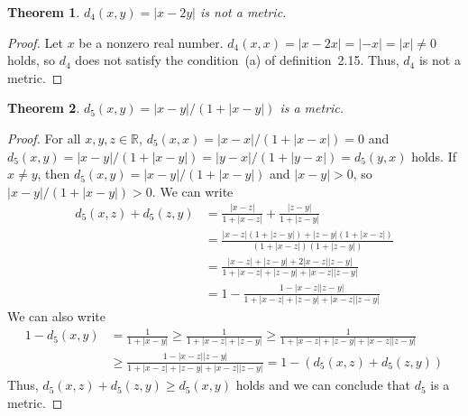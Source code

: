 \documentclass{scrartcl}
\newtheorem{theorem}{Theorem}
\begin{document}
\begin{theorem}
  \(d_4(x, y) = |x - 2y|\) is not a metric.
\end{theorem}
\begin{proof}
  Let \(x\) be a nonzero real number.
  \(d_4(x, x) = |x - 2x| = |-x| = |x| \not = 0\) holds, so \(d_4\) does not satisfy the condition~(a) of definition~2.15.
  Thus, \(d_4\) is not a metric.
\end{proof}

\begin{theorem}
  \(d_5(x, y) = |x - y| / (1 + |x - y|)\) is a metric.
\end{theorem}
\begin{proof}
  For all \(x, y, z \in \mathbb{R}\), \(d_5(x, x) = |x - x| / (1 + |x - x|) = 0\) and \(d_5(x, y) = |x - y| / (1 + |x - y|) = |y - x| / (1 + |y - x|) = d_5(y, x)\) holds.
  If \(x \not = y\), then \(d_5(x, y) = |x - y| / (1 + |x - y|)\) and \(|x - y| > 0\), so \(|x - y| / (1 + |x - y|) > 0\).
  We can write
  \begin{align*}
    d_5(x, z) + d_5(z, y) &= \frac{|x - z|}{1 + |x - z|} + \frac{|z - y|}{1 + |z - y|} \\
                          &= \frac{|x - z|(1 + |z - y|) + |z - y|(1 + |x - z|)}{(1 + |x - z|)(1 + |z - y|)} \\
                          &= \frac{|x - z| + |z - y| + 2|x - z||z - y|}{1 + |x - z| + |z - y| + |x - z||z - y|} \\
                          &= 1 - \frac{1 - |x - z||z - y|}{1 + |x - z| + |z - y| + |x - z||z - y|}
  \end{align*}
  We can also write
  \begin{align*}
    1 - d_5(x, y) &= \frac{1}{1 + |x - y|} \geq \frac{1}{1 + |x - z| + |z - y|} \geq \frac{1}{1 + |x - z| + |z - y| + |x - z||z - y|} \\
                  &\geq \frac{1 - |x - z||z - y|}{1 + |x - z| + |z - y| + |x - z||z - y|} = 1 - (d_5(x, z) + d_5(z, y))
  \end{align*}
  Thus, \(d_5(x, z) + d_5(z, y) \geq d_5(x, y)\) holds and we can conclude that \(d_5\) is a metric.
\end{proof}
\end{document}
